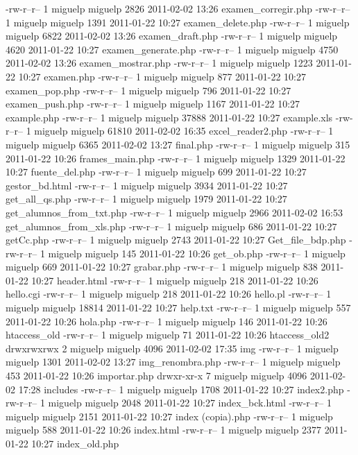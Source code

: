 -rw-r--r--  1 miguelp miguelp     2826 2011-02-02 13:26 examen_corregir.php
-rw-r--r--  1 miguelp miguelp     1391 2011-01-22 10:27 examen_delete.php
-rw-r--r--  1 miguelp miguelp     6822 2011-02-02 13:26 examen_draft.php
-rw-r--r--  1 miguelp miguelp     4620 2011-01-22 10:27 examen_generate.php
-rw-r--r--  1 miguelp miguelp     4750 2011-02-02 13:26 examen_mostrar.php
-rw-r--r--  1 miguelp miguelp     1223 2011-01-22 10:27 examen.php
-rw-r--r--  1 miguelp miguelp      877 2011-01-22 10:27 examen_pop.php
-rw-r--r--  1 miguelp miguelp      796 2011-01-22 10:27 examen_push.php
-rw-r--r--  1 miguelp miguelp     1167 2011-01-22 10:27 example.php
-rw-r--r--  1 miguelp miguelp    37888 2011-01-22 10:27 example.xls
-rw-r--r--  1 miguelp miguelp    61810 2011-02-02 16:35 excel_reader2.php
-rw-r--r--  1 miguelp miguelp     6365 2011-02-02 13:27 final.php
-rw-r--r--  1 miguelp miguelp      315 2011-01-22 10:26 frames_main.php
-rw-r--r--  1 miguelp miguelp     1329 2011-01-22 10:27 fuente_del.php
-rw-r--r--  1 miguelp miguelp      699 2011-01-22 10:27 gestor_bd.html
-rw-r--r--  1 miguelp miguelp     3934 2011-01-22 10:27 get_all_qs.php
-rw-r--r--  1 miguelp miguelp     1979 2011-01-22 10:27 get_alumnos_from_txt.php
-rw-r--r--  1 miguelp miguelp     2966 2011-02-02 16:53 get_alumnos_from_xls.php
-rw-r--r--  1 miguelp miguelp      686 2011-01-22 10:27 getCc.php
-rw-r--r--  1 miguelp miguelp     2743 2011-01-22 10:27 Get_file_bdp.php
-rw-r--r--  1 miguelp miguelp      145 2011-01-22 10:26 get_ob.php
-rw-r--r--  1 miguelp miguelp      669 2011-01-22 10:27 grabar.php
-rw-r--r--  1 miguelp miguelp      838 2011-01-22 10:27 header.html
-rw-r--r--  1 miguelp miguelp      218 2011-01-22 10:26 hello.cgi
-rw-r--r--  1 miguelp miguelp      218 2011-01-22 10:26 hello.pl
-rw-r--r--  1 miguelp miguelp    18814 2011-01-22 10:27 help.txt
-rw-r--r--  1 miguelp miguelp      557 2011-01-22 10:26 hola.php
-rw-r--r--  1 miguelp miguelp      146 2011-01-22 10:26 htaccess_old
-rw-r--r--  1 miguelp miguelp       71 2011-01-22 10:26 htaccess_old2
drwxrwxrwx  2 miguelp miguelp     4096 2011-02-02 17:35 img
-rw-r--r--  1 miguelp miguelp     1301 2011-02-02 13:27 img_renombra.php
-rw-r--r--  1 miguelp miguelp      453 2011-01-22 10:26 importar.php
drwxr-xr-x  7 miguelp miguelp     4096 2011-02-02 17:28 includes
-rw-r--r--  1 miguelp miguelp     1708 2011-01-22 10:27 index2.php
-rw-r--r--  1 miguelp miguelp     2048 2011-01-22 10:27 index_bck.html
-rw-r--r--  1 miguelp miguelp     2151 2011-01-22 10:27 index (copia).php
-rw-r--r--  1 miguelp miguelp      588 2011-01-22 10:26 index.html
-rw-r--r--  1 miguelp miguelp     2377 2011-01-22 10:27 index_old.php
